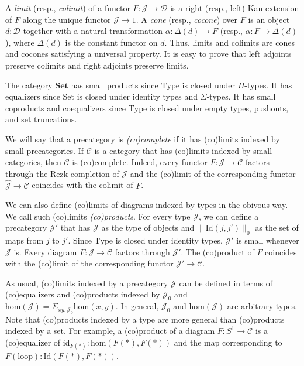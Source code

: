 \documentclass[reqno]{amsart}
\theoremstyle{definition}
\theoremstyle{remark}
\newcommand{\fs}[1]{\mathrm{#1}}
\newcommand{\cat}[1]{\mathbf{#1}}
\newcommand{\scat}[1]{\mathcal{#1}}
\renewcommand{\hom}{\fs{hom}}
\newcommand{\id}{\fs{id}}
\newcommand{\Id}{\fs{Id}}
\newcommand{\Set}{\cat{Set}}
\newcommand{\uSet}{\fs{Set}}
\newcommand{\uType}{\fs{Type}}
\newcommand{\ob}[1]{#1_0}
\numberwithin{figure}{section}
\begin{document}
A \emph{limit} (resp., \emph{colimit}) of a functor $F : \scat{J} \to \scat{D}$ is a right (resp., left) Kan extension of $F$ along the unique functor $\scat{J} \to 1$.
A \emph{cone} (resp., \emph{cocone}) over $F$ is an object $d : \scat{D}$ together with a natural transformation $\alpha : \Delta(d) \to F$ (resp., $\alpha : F \to \Delta(d)$), where $\Delta(d)$ is the constant functor on $d$.
Thus, limits and colimits are cones and cocones satisfying a universal property.
It is easy to prove that left adjoints preserve colimits and right adjoints preserve limits.

\begin{example}
The category $\Set$ has small products since $\uType$ is closed under $\Pi$-types.
It has equalizers since $\uSet$ is closed under identity types and $\Sigma$-types.
It has small coproducts and coequalizers since $\uType$ is closed under empty types, pushouts, and set truncations.
\end{example}

We will say that a precategory is \emph{(co)complete} if it has (co)limits indexed by small precategories.
If $\scat{C}$ is a category that has (co)limits indexed by small categories, then $\scat{C}$ is (co)complete.
Indeed, every functor $F : \scat{J} \to \scat{C}$ factors through the Rezk completion of $\scat{J}$ and the (co)limit of the corresponding functor $\widehat{\scat{J}} \to \scat{C}$ coincides with the colimit of $F$.

We can also define (co)limits of diagrams indexed by types in the obivous way.
We call such (co)limits \emph{(co)products}.
For every type $\scat{J}$, we can define a precategory $\scat{J}'$ that has $\scat{J}$ as the type of objects and $\| \Id(j,j') \|_0$ as the set of maps from $j$ to $j'$.
Since $\uType$ is closed under identity types, $\scat{J}'$ is small whenever $\scat{J}$ is.
Every diagram $F : \scat{J} \to \scat{C}$ factors through $\scat{J}'$.
The (co)product of $F$ coincides with the (co)limit of the corresponding functor $\scat{J}' \to \scat{C}$.

As usual, (co)limits indexed by a precategory $\scat{J}$ can be defined in terms of (co)equalizers and (co)products indexed by $\ob{\scat{J}}$ and $\hom(\scat{J}) = \Sigma_{x y : \ob{\scat{J}}} \hom(x,y)$.
In general, $\ob{\scat{J}}$ and $\hom(\scat{J})$ are arbitrary types.
Note that (co)products indexed by a type are more general than (co)products indexed by a set.
For example, a (co)product of a diagram $F : S^1 \to \scat{C}$ is a (co)equalizer of $\id_{F(*)} : \hom(F(*),F(*))$ and the map corresponding to $F(\fs{loop}) : \Id(F(*),F(*))$.
\end{document}
